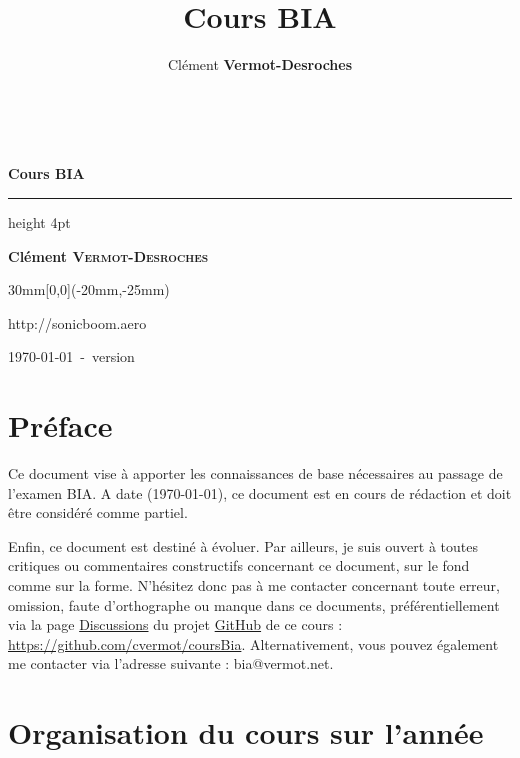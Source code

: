 \documentclass[a4paper,12pt,oneside]{report} %
\title{Cours BIA} %
\author{Clément \textbf{Vermot-Desroches}} %
\begin{document}
	
	\begin{titlepage}
		\begin{center} 
			~
			\vfill
			\begin{flushleft}
				\huge \textbf{Cours BIA}
			\end{flushleft}
			\par
			\hrule height 4pt
			\par
			\begin{flushright}
				\Large \textbf{Clément \textsc{Vermot-Desroches}}
				\par
			\end{flushright}
			\vspace{2cm}
			\vfill
			\vfill
		\end{center}
			\begin{textblock*}{30mm}[0,0](-20mm,-25mm)
			\end{textblock*}
		\begin{center}
			http://sonicboom.aero
			
			\today~-~version~
		\end{center} 
	\end{titlepage} 	
	

	\tableofcontents
	\newpage	
	
	\section{Préface}

	Ce document vise à apporter les connaissances de base nécessaires au passage de l'examen BIA. A date (\today), ce document est en cours de rédaction et doit être considéré comme partiel.

	Enfin, ce document est destiné à évoluer. Par ailleurs, je suis ouvert à toutes critiques ou commentaires constructifs concernant ce document, sur le fond comme sur la forme. N'hésitez donc pas à me contacter concernant toute erreur, omission, faute d'orthographe ou manque dans ce documents, préférentiellement via la page \href{https://github.com/cvermot/coursBia/discussions}{Discussions} du projet \href{https://github.com/cvermot/coursBia}{GitHub} de ce cours : \url{https://github.com/cvermot/coursBia}. Alternativement, vous pouvez également me contacter via l'adresse suivante : bia@vermot.net.
	
	\section{Organisation du cours sur l'année}
	
\end{document}
